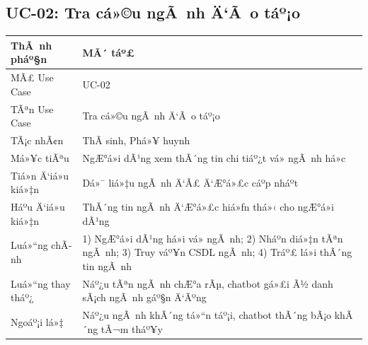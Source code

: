 ﻿\documentclass[12pt,a4paper]{report}
\begin{document}
\subsection{UC-02: Tra cá»©u ngÃ nh Ä‘Ã o táº¡o}
\begin{table}[H]
\centering
\begin{tabular}{|p{3.5cm}|p{8.5cm}|}
\hline
\textbf{ThÃ nh pháº§n} & \textbf{MÃ´ táº£} \\ \hline
MÃ£ Use Case & UC-02 \\ \hline
TÃªn Use Case & Tra cá»©u ngÃ nh Ä‘Ã o táº¡o \\ \hline
TÃ¡c nhÃ¢n & ThÃ­ sinh, Phá»¥ huynh \\ \hline
Má»¥c tiÃªu & NgÆ°á»i dÃ¹ng xem thÃ´ng tin chi tiáº¿t vá» ngÃ nh há»c \\ \hline
Tiá»n Ä‘iá»u kiá»‡n & Dá»¯ liá»‡u ngÃ nh Ä‘Ã£ Ä‘Æ°á»£c cáº­p nháº­t \\ \hline
Háº­u Ä‘iá»u kiá»‡n & ThÃ´ng tin ngÃ nh Ä‘Æ°á»£c hiá»ƒn thá»‹ cho ngÆ°á»i dÃ¹ng \\ \hline
Luá»“ng chÃ­nh & 1) NgÆ°á»i dÃ¹ng há»i vá» ngÃ nh; 2) Nháº­n diá»‡n tÃªn ngÃ nh; 3) Truy váº¥n CSDL ngÃ nh; 4) Tráº£ lá»i thÃ´ng tin ngÃ nh \\ \hline
Luá»“ng thay tháº¿ & Náº¿u tÃªn ngÃ nh chÆ°a rÃµ, chatbot gá»£i Ã½ danh sÃ¡ch ngÃ nh gáº§n Ä‘Ãºng \\ \hline
Ngoáº¡i lá»‡ & Náº¿u ngÃ nh khÃ´ng tá»“n táº¡i, chatbot thÃ´ng bÃ¡o khÃ´ng tÃ¬m tháº¥y \\ \hline
\end{tabular}
\end{table}
\end{document}
